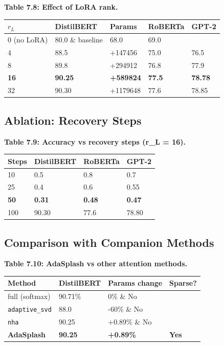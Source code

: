 \textbf{Table 7.8: Effect of LoRA rank.}

\begin{table}[H]
\centering
\small
\begin{tabular}{lllll}
\toprule
\textbf{$r_L$} & \textbf{DistilBERT} & \textbf{Params} & \textbf{RoBERTa} & \textbf{GPT-2} \\
\midrule
0 (no LoRA) & 80.0 \& baseline & 68.0 & 69.0 \\
4 & 88.5 & +147456 & 75.0 & 76.5 \\
8 & 89.8 & +294912 & 76.8 & 77.9 \\
\textbf{16} & \textbf{90.25} & \textbf{+589824} & \textbf{77.5} & \textbf{78.78} \\
32 & 90.30 & +1179648 & 77.6 & 78.85 \\
\bottomrule
\end{tabular}
\end{table}

\subsection{Ablation: Recovery Steps}

\textbf{Table 7.9: Accuracy vs recovery steps (r\_L = 16).}

\begin{table}[H]
\centering
\small
\begin{tabular}{llll}
\toprule
\textbf{Steps} & \textbf{DistilBERT} & \textbf{RoBERTa} & \textbf{GPT-2} \\
\midrule
10 & 0.5 & 0.8 & 0.7 \\
25 & 0.4 & 0.6 & 0.55 \\
\textbf{50} & \textbf{0.31} & \textbf{0.48} & \textbf{0.47} \\
100 & 90.30 & 77.6 & 78.80 \\
\bottomrule
\end{tabular}
\end{table}

\subsection{Comparison with Companion Methods}

\textbf{Table 7.10: AdaSplash vs other attention methods.}

\begin{table}[H]
\centering
\small
\begin{tabular}{llll}
\toprule
\textbf{Method} & \textbf{DistilBERT} & \textbf{Params change} & \textbf{Sparse?} \\
\midrule
full (softmax) & 90.71\% & 0\% \& No \\
\texttt{adaptive\_svd} & 88.0 & -60\% \& No \\
\texttt{nha} & 90.25 & +0.89\% \& No \\
\textbf{AdaSplash} & \textbf{90.25} & \textbf{+0.89\%} & \textbf{Yes} \\
\bottomrule
\end{tabular}
\end{table}

